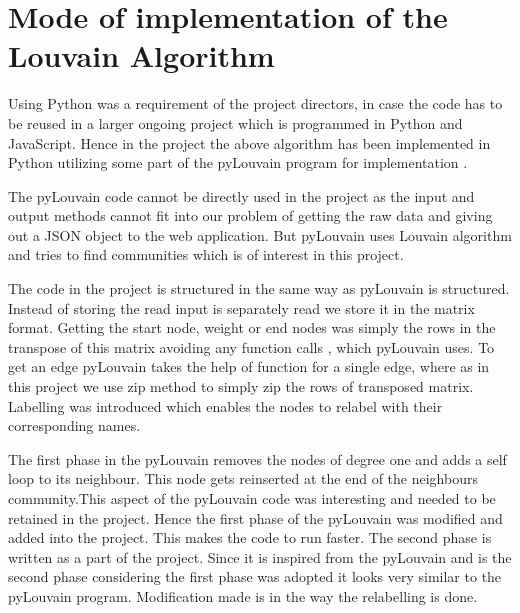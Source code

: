 \section{Mode of implementation of the Louvain Algorithm}
\par Using Python was a requirement of the project directors, in case the code has to be reused in a larger ongoing project which is programmed in Python and JavaScript. Hence in the project the above algorithm has been implemented in Python utilizing some part of the pyLouvain program for implementation \cite{pyLouvain}. 
\par The pyLouvain code cannot be directly used in the project as the input and output methods cannot fit into our problem of getting the raw data and giving out a JSON object to the web application. But pyLouvain uses Louvain algorithm and tries to find communities which is of interest in this project. 
\par The code in the project is structured in the same way as pyLouvain is structured. Instead of storing the read input is separately read we store it in the matrix format. Getting the start node, weight or end nodes was simply the rows in the transpose of this matrix avoiding any function calls , which pyLouvain uses. To get an edge pyLouvain takes the help of function for a single edge, where as in this project we use zip method to simply zip the rows of transposed matrix. Labelling was introduced which enables the nodes to relabel with their corresponding names.
\par The first phase in the pyLouvain removes the nodes of degree one and adds a self loop to its neighbour. This node gets reinserted at the end of the neighbours community.This aspect of the pyLouvain code was interesting and needed to be retained in the project.
Hence the first phase of the pyLouvain was modified and added into the project. 
This makes the code to run faster. The second phase is written as a part of the project. Since it is inspired from the pyLouvain and is the second phase considering the first phase was adopted it looks very similar to the pyLouvain program. Modification made is in the way the relabelling is done.

